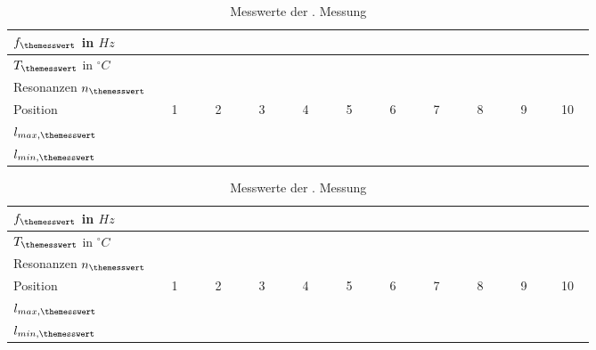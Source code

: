 \begin{table}[h!]
	\label{tab:messprotokoll->messung_3}
	\caption{Messwerte der {\themesswert}. Messung}
	\centering
	\begin{tabular}{|l|c|c|c|c|c|c|c|c|c|c|}
	\hline 
	$f_{\themesswert}$ in $Hz$ & \multicolumn{10}{c|}{~} \\ 
	\hline 
	$T_{\themesswert}$ in $^{\circ}C$ & \multicolumn{10}{c|}{~} \\ 
	\hline 
	Resonanzen $n_{\themesswert}$& \multicolumn{10}{c|}{~} \\ 
	\hline \rowcolor{secondcsvrow}
	Position & 1 & 2 & 3 & 4 & 5 & 6 & 7 & 8 & 9 & 10 \\ 
	\hline 
	$l_{max,{\themesswert}}$ & ~~~~~ & ~~~~~ & ~~~~~ & ~~~~~ & ~~~~~ & ~~~~~ & ~~~~~ & ~~~~~ & ~~~~~ & ~~~~~ \\ 
	\hline 
	$l_{min,{\themesswert}}$ & ~~~~~ & ~~~~~ & ~~~~~ & ~~~~~ & ~~~~~ & ~~~~~ & ~~~~~ & ~~~~~ & ~~~~~ & ~~~~~ \\
	\hline 
	\end{tabular} 	
\end{table}

\begin{table}[h!]
	\label{tab:messprotokoll->messung_4}
	\caption{Messwerte der {\themesswert}. Messung}
	\centering
	\begin{tabular}{|l|c|c|c|c|c|c|c|c|c|c|}
	\hline 
	$f_{\themesswert}$ in $Hz$ & \multicolumn{10}{c|}{~} \\ 
	\hline 
	$T_{\themesswert}$ in $^{\circ}C$ & \multicolumn{10}{c|}{~} \\ 
	\hline 
	Resonanzen $n_{\themesswert}$& \multicolumn{10}{c|}{~} \\ 
	\hline \rowcolor{secondcsvrow}
	Position & 1 & 2 & 3 & 4 & 5 & 6 & 7 & 8 & 9 & 10 \\ 
	\hline 
	$l_{max,{\themesswert}}$ & ~~~~~ & ~~~~~ & ~~~~~ & ~~~~~ & ~~~~~ & ~~~~~ & ~~~~~ & ~~~~~ & ~~~~~ & ~~~~~ \\ 
	\hline 
	$l_{min,{\themesswert}}$ & ~~~~~ & ~~~~~ & ~~~~~ & ~~~~~ & ~~~~~ & ~~~~~ & ~~~~~ & ~~~~~ & ~~~~~ & ~~~~~ \\
	\hline 
	\end{tabular} 	
\end{table}
 
\newpage
{}